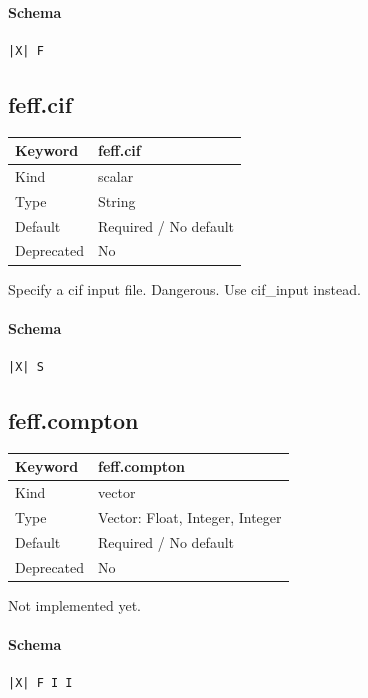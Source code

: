 \documentclass[11pt]{article}
\begin{document}
{{{\paragraph{Schema}
\begin{Verbatim}
|X| F
\end{Verbatim}

\subsection{feff.cif}
\label{kw:feff-cif}
\begin{longtable}{|p{1.5in}|p{4.5in}|}
\hline
Keyword & feff.cif \\
\hline
Kind & scalar \\
\hline
Type & String \\
\hline
Default & Required / No default \\
\hline
Deprecated & No \\
\hline
\end{longtable}
 Specify a cif input file. Dangerous. Use cif\_input instead.

\paragraph{Schema}
\begin{Verbatim}
|X| S
\end{Verbatim}

\subsection{feff.compton}
\label{kw:feff-compton}
\begin{longtable}{|p{1.5in}|p{4.5in}|}
\hline
Keyword & feff.compton \\
\hline
Kind & vector \\
\hline
Type & Vector: Float, Integer, Integer \\
\hline
Default & Required / No default \\
\hline
Deprecated & No \\
\hline
\end{longtable}
 Not implemented yet.

\paragraph{Schema}
\begin{Verbatim}
|X| F I I
\end{Verbatim}

}}}
\end{document}
